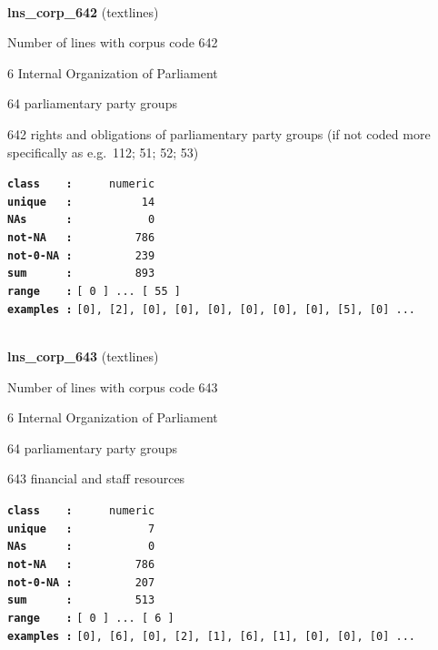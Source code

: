 \documentclass[]{article}
\begin{document}
~

\textbf{lns\_corp\_642} (textlines)

Number of lines with corpus code 642

6 Internal Organization of Parliament

64 parliamentary party groups

642 rights and obligations of parliamentary party groups (if not coded
more specifically as e.g.~112; 51; 52; 53)

\textbf{\texttt{class\ \ \ \ :}} \texttt{~~~~~numeric}\\
\textbf{\texttt{unique\ \ \ :}} \texttt{~~~~~~~~~~14}\\
\textbf{\texttt{NAs\ \ \ \ \ \ :}} \texttt{~~~~~~~~~~~0}\\
\textbf{\texttt{not-NA\ \ \ :}} \texttt{~~~~~~~~~786}\\
\textbf{\texttt{not-0-NA\ :}} \texttt{~~~~~~~~~239}\\
\textbf{\texttt{sum\ \ \ \ \ \ :}} \texttt{~~~~~~~~~893}\\
\textbf{\texttt{range\ \ \ \ :}}
\texttt{{[}\ 0\ {]}\ ...\ {[}\ 55\ {]}}\\
\textbf{\texttt{examples\ :}}
\texttt{{[}0{]},\ {[}2{]},\ {[}0{]},\ {[}0{]},\ {[}0{]},\ {[}0{]},\ {[}0{]},\ {[}0{]},\ {[}5{]},\ {[}0{]}\ ...}\\

~

\textbf{lns\_corp\_643} (textlines)

Number of lines with corpus code 643

6 Internal Organization of Parliament

64 parliamentary party groups

643 financial and staff resources

\textbf{\texttt{class\ \ \ \ :}} \texttt{~~~~~numeric}\\
\textbf{\texttt{unique\ \ \ :}} \texttt{~~~~~~~~~~~7}\\
\textbf{\texttt{NAs\ \ \ \ \ \ :}} \texttt{~~~~~~~~~~~0}\\
\textbf{\texttt{not-NA\ \ \ :}} \texttt{~~~~~~~~~786}\\
\textbf{\texttt{not-0-NA\ :}} \texttt{~~~~~~~~~207}\\
\textbf{\texttt{sum\ \ \ \ \ \ :}} \texttt{~~~~~~~~~513}\\
\textbf{\texttt{range\ \ \ \ :}}
\texttt{{[}\ 0\ {]}\ ...\ {[}\ 6\ {]}}\\
\textbf{\texttt{examples\ :}}
\texttt{{[}0{]},\ {[}6{]},\ {[}0{]},\ {[}2{]},\ {[}1{]},\ {[}6{]},\ {[}1{]},\ {[}0{]},\ {[}0{]},\ {[}0{]}\ ...}\\
\end{document}
